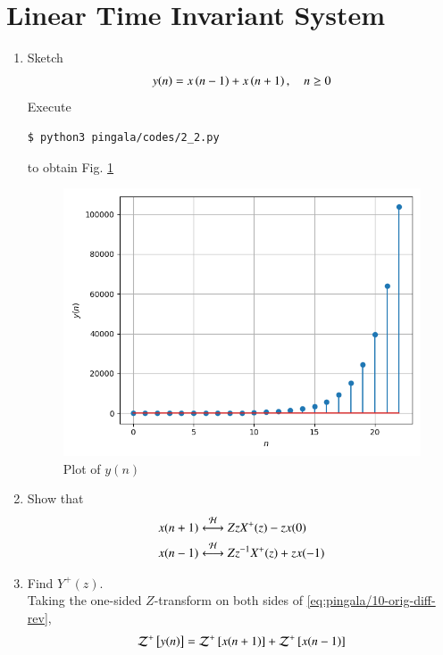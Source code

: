 \documentclass[journal,12pt,twocolumn]{IEEEtran}
\renewcommand\thesection{\arabic{section}}
\begin{document}
\section{Linear Time Invariant System}
\begin{enumerate}[label=\thesection.\arabic*,ref=\thesection.\theenumi]
	\item Sketch 
\begin{align}
	y(n) = x\brak{n-1} + x\brak{n+1},  \quad n \ge 0
	\label{eq:pingala/10-orig-diff-rev}
\end{align}
\solution
Execute
\begin{lstlisting}
$ python3 pingala/codes/2_2.py
\end{lstlisting}
to obtain Fig. 
    \ref{fig:pingala/yn}
\begin{figure}[!htbp]
    \includegraphics[width=\columnwidth]{pingala/figs/2_2.png}
    \caption{Plot of $y(n)$}
    \label{fig:pingala/yn}
\end{figure}
\item Show that 
\begin{align}
	x(n + 1)&\overset{\mathcal{H}}{ \longleftrightarrow}{Z}  zX^+(z) - zx(0)
	\\
	x(n - 1)&\overset{\mathcal{H}}{ \longleftrightarrow}{Z}   z^{-1}X^+(z) + zx(-1) 
\end{align}
\item Find $Y^{+}(z)$. 
	\\
\solution Taking the one-sided $Z$-transform on both sides of \eqref{eq:pingala/10-orig-diff-rev},
\begin{align}
	\mathcal{Z}^+\sbrak{y(n)} &= \mathcal{Z}^+\sbrak{x(n + 1)} + \mathcal{Z}^+\sbrak{x(n - 1)} \\

\end{align}
\end{enumerate}
\end{document}
